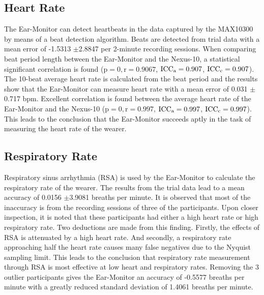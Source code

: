 \subsection{Heart Rate}
The Ear-Monitor can detect heartbeats in the data captured by the MAX10300 by means of a beat detection algorithm. Beats are detected from trial data with a mean error of -1.5313 $\pm$2.8847 per 2-minute recording sessions. When comparing beat period length between the Ear-Monitor and the Nexus-10, a statistical significant correlation is found ($\text{p}=0, \text{r}=0.9067$, $\text{ICC\textsubscript{a}} = 0.907$, $\text{ICC\textsubscript{c}} = 0.907$). The 10-beat average heart rate is calculated from the beat period and the results show that the Ear-Monitor can measure heart rate with a mean error of 0.031 $\pm$0.717 bpm. Excellent correlation is found between the average heart rate of the Ear-Monitor and the Nexus-10 ($\text{p}=0, \text{r}=0.997$, $\text{ICC\textsubscript{a}} = 0.997$, $\text{ICC\textsubscript{c}} = 0.997$). This leads to the conclusion that the Ear-Monitor succeeds aptly in the task of measuring the heart rate of the wearer.

\subsection{Respiratory Rate}
Respiratory sinus arrhythmia (RSA) is used by the Ear-Monitor to calculate the respiratory rate of the wearer. The results from the trial data lead to a mean accuracy of 0.0156 $\pm$3.9081 breaths per minute. It is observed that most of the inaccuracy is from the recording sessions of three of the participants. Upon closer inspection, it is noted that these participants had either a high heart rate or high respiratory rate. Two deductions are made from this finding. Firstly, the effects of RSA is attenuated by a high heart rate. And secondly, a respiratory rate approaching half the heart rate causes many false negatives due to the Nyquist sampling limit. This leads to the conclusion that respiratory rate measurement through RSA is most effective at low heart and respiratory rates. Removing the 3 outlier participants gives the Ear-Monitor an accuracy of -0.5577 breaths per minute with a greatly reduced standard deviation of 1.4061 breaths per minute.

